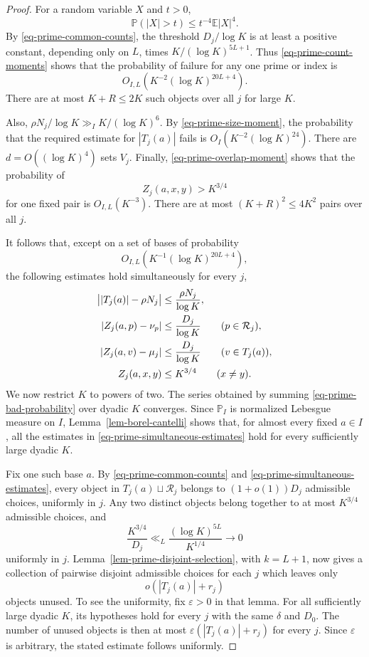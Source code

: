 \documentclass[11pt,reqno]{amsart}
\numberwithin{equation}{section}
\begin{document}
\begin{proof}
For a random variable $X$ and $t>0$,
\[
 \mathbb P(|X|>t)\le t^{-4}\mathbb E|X|^4.
\]
By \eqref{eq-prime-common-counts}, the threshold $D_j/\log K$ is at least a positive constant, depending only on $L$, times $K/(\log K)^{5L+1}$. Thus \eqref{eq-prime-count-moments} shows that the probability of failure for any one prime or index is
\[
 O_{I,L}\left(K^{-2}(\log K)^{20L+4}\right).
\]
There are at most $K+R\le2K$ such objects over all $j$ for large $K$.

Also, $\rho N_j/\log K\gg_I K/(\log K)^6$. By \eqref{eq-prime-size-moment}, the probability that the required estimate for $|T_j(a)|$ fails is $O_I(K^{-2}(\log K)^{24})$. There are $d=O((\log K)^4)$ sets $V_j$. Finally, \eqref{eq-prime-overlap-moment} shows that the probability of
\[
 Z_j(a,x,y)>K^{3/4}
\]
for one fixed pair is $O_{I,L}(K^{-3})$. There are at most $(K+R)^2\le4K^2$ pairs over all $j$.

It follows that, except on a set of bases of probability
\begin{equation}\label{eq-prime-bad-probability}
 O_{I,L}\left(K^{-1}(\log K)^{20L+4}\right),
\end{equation}
the following estimates hold simultaneously for every $j$,
\begin{align}\label{eq-prime-simultaneous-estimates}
 \bigl||T_j(a)|-\rho N_j\bigr|&\le\frac{\rho N_j}{\log K},\notag\\
 |Z_j(a,p)-\nu_p|&\le\frac{D_j}{\log K}
                 \qquad(p\in\mathcal R_j),\notag\\
 |Z_j(a,v)-\mu_j|&\le\frac{D_j}{\log K}
                 \qquad(v\in T_j(a)),\notag\\
 Z_j(a,x,y)&\le K^{3/4}
                 \qquad(x\ne y).
\end{align}
We now restrict $K$ to powers of two. The series obtained by summing \eqref{eq-prime-bad-probability} over dyadic $K$ converges. Since $\mathbb P_I$ is normalized Lebesgue measure on $I$, Lemma~\ref{lem-borel-cantelli} shows that, for almost every fixed $a\in I$, all the estimates in \eqref{eq-prime-simultaneous-estimates} hold for every sufficiently large dyadic $K$.

Fix one such base $a$. By \eqref{eq-prime-common-counts} and \eqref{eq-prime-simultaneous-estimates}, every object in $T_j(a)\sqcup\mathcal R_j$ belongs to $(1+o(1))D_j$ admissible choices, uniformly in $j$. Any two distinct objects belong together to at most $K^{3/4}$ admissible choices, and
\[
 \frac{K^{3/4}}{D_j}
 \ll_L\frac{(\log K)^{5L}}{K^{1/4}}
 \longrightarrow0
\]
uniformly in $j$. Lemma~\ref{lem-prime-disjoint-selection}, with $k=L+1$, now gives a collection of pairwise disjoint admissible choices for each $j$ which leaves only
\[
 o(|T_j(a)|+r_j)
\]
objects unused. To see the uniformity, fix $\varepsilon>0$ in that lemma. For all sufficiently large dyadic $K$, its hypotheses hold for every $j$ with the same $\delta$ and $D_0$. The number of unused objects is then at most $\varepsilon(|T_j(a)|+r_j)$ for every $j$. Since $\varepsilon$ is arbitrary, the stated estimate follows uniformly.


\end{proof}
\end{document}
